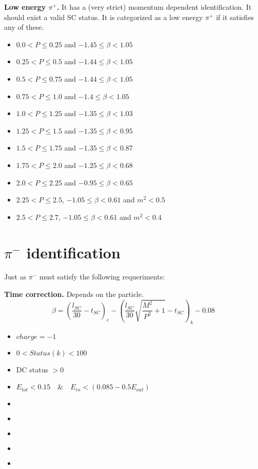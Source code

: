 \textbf{Low energy $\pi^+$.} It has a (very strict) momentum dependent identification. It should exist a valid SC status. It is categorized as a low energy $\pi^+$ if it satisfies any of these.
\begin{itemize}
    \item $0.0 < P \le 0.25$ and $-1.45 \le \beta < 1.05$
    \item $0.25 < P \le 0.5$ and $-1.44 \le \beta < 1.05$
    \item $0.5 < P \le 0.75$ and $-1.44 \le \beta < 1.05$
    \item $0.75 < P \le 1.0$ and $-1.4 \le \beta < 1.05$
    \item $1.0 < P \le 1.25$ and $-1.35 \le \beta < 1.03$
    \item $1.25 < P \le 1.5$ and $-1.35 \le \beta < 0.95$
    \item $1.5 < P \le 1.75$ and $-1.35 \le \beta < 0.87$
    \item $1.75 < P \le 2.0$ and $-1.25 \le \beta < 0.68$
    \item $2.0 < P \le 2.25$ and $-0.95 \le \beta < 0.65$
    \item $2.25 < P \le 2.5$, $-1.05 \le \beta < 0.61$ and $m^2 < 0.5$
    \item $2.5 < P \le 2.7$, $-1.05 \le \beta < 0.61$ and $m^2 < 0.4$
\end{itemize}


\section{$\pi^{-}$ identification}            

Just as $\pi^{-}$ must satisfy the following requeriments:


\textbf{Time correction.} Depends on the particle.
\begin{equation}
    \beta = \left(\frac{l_{SC}}{30} - t_{SC}\right)_e - \left(\frac{l_{SC}}{30} \sqrt{\frac{M^2}{P^2} + 1} - t_{SC} \right)_{k} - 0.08
\end{equation} 
    
    
    \begin{itemize}
        \item $ charge = -1 $
        \item $ 0 < Status(k) < 100$
        \item DC status $ > 0 $
        \item $ E_{tot} < 0.15 \quad\&\quad E_{in} < (0.085 - 0.5 E_{out}) $
        \item $  $
        \item $  $
        \item $  $
        \item $  $
        \item $  $
    \end{itemize}
    
